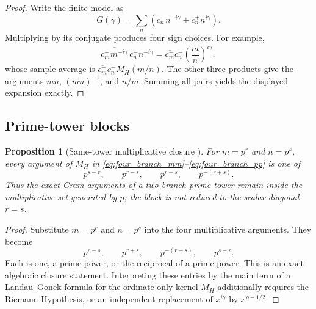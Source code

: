 \documentclass[11pt]{amsart}
\numberwithin{equation}{section}
\theoremstyle{plain}
\newtheorem{proposition}[theorem]{Proposition}
\theoremstyle{definition}
\theoremstyle{remark}
\newcommand{\1}{\mathbf{1}}
\begin{document}
\begin{proof}
Write the finite model as
\begin{equation}
G(\gamma)
=
\sum_n\left(c_n^-n^{-i\gamma}+c_n^+n^{i\gamma}\right).
\label{eq:four_branch_G_definition}
\end{equation}
Multiplying by its conjugate produces four sign choices.  For example,
\begin{equation}
\overline{c_m^-m^{-i\gamma}}\,c_n^-n^{-i\gamma}
=
\overline{c_m^-}c_n^-
\left(\frac mn\right)^{i\gamma},
\label{eq:four_branch_minus_minus}
\end{equation}
whose sample average is
\(\overline{c_m^-}c_n^-M_H(m/n)\).  The other three products give the
arguments \(mn\), \((mn)^{-1}\), and \(n/m\).  Summing all pairs yields
the displayed expansion exactly.
\end{proof}

\subsection{Prime-tower blocks}
\label{subsec:prime_tower_blocks}


\begin{proposition}[Same-tower multiplicative closure {}]
\label{prop:same_tower_resonance}
For $m=p^r$ and $n=p^s$, every argument of $M_H$ in
\eqref{eq:four_branch_mm}--\eqref{eq:four_branch_pp} is one of
\begin{equation}
p^{s-r},
\qquad
p^{r-s},
\qquad
p^{r+s},
\qquad
p^{-(r+s)}.
\label{eq:same_tower_arguments}
\end{equation}
Thus the exact Gram arguments of a two-branch prime tower remain inside
the multiplicative set generated by \(p\); the block is not reduced to the
scalar diagonal \(r=s\).
\end{proposition}

\begin{proof}
Substitute \(m=p^r\) and \(n=p^s\) into the four multiplicative arguments.
They become
\begin{equation}
p^{r-s},
\qquad
p^{r+s},
\qquad
p^{-(r+s)},
\qquad
p^{s-r}.
\label{eq:same_tower_arguments_proof}
\end{equation}
Each is one, a prime power, or the reciprocal of a prime power.  This is
an exact algebraic closure statement.  Interpreting these entries by the
main term of a Landau--Gonek formula for the ordinate-only kernel
\(M_H\) additionally requires the Riemann Hypothesis, or an independent
replacement of \(x^{i\gamma}\) by \(x^{\rho-1/2}\).
\end{proof}
\end{document}
